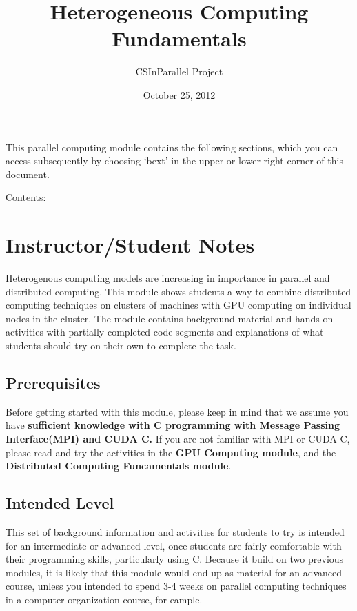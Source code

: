 \documentclass[letterpaper,10pt,openany,oneside]{sphinxmanual}
\title{Heterogeneous Computing Fundamentals}
\date{October 25, 2012}
\author{CSInParallel Project}
\begin{document}
\maketitle
\tableofcontents
{}\label{index::doc}


This parallel computing module contains the following sections, which
you can access subsequently by choosing `bext' in the upper or lower right
corner of this document.

Contents:


\chapter{Instructor/Student Notes}
\label{Prerequisites/Prerequisites:heterogeneous-computing-fundamentals}\label{Prerequisites/Prerequisites:instructor-student-notes}\label{Prerequisites/Prerequisites::doc}
Heterogenous computing models are increasing in importance in parallel and distributed computing.
This module shows students a way to combine distributed computing techniques on clusters of machines with GPU computing on individual nodes in the cluster.  The module contains background material and hands-on activities with partially-completed code segments and explanations of what students should try on their own to complete the task.


\section{Prerequisites}
\label{Prerequisites/Prerequisites:prerequisites}
Before getting started with this module, please keep in mind that we assume you have \textbf{sufficient knowledge with C programming with Message Passing Interface(MPI) and CUDA C.} If you are not familiar with MPI or CUDA C, please read and try the activities in the \textbf{GPU Computing module}, and the \textbf{Distributed Computing Funcamentals module}.


\section{Intended Level}
\label{Prerequisites/Prerequisites:intended-level}
This set of background information and activities for students to try is intended for an intermediate or advanced level, once students are fairly comfortable with their programming skills, particularly using C.  Because it build on two previous modules, it is likely that this module would end up as material for an advanced course, unless you intended to spend 3-4 weeks on parallel computing techniques in a computer organization course, for eample.
\end{document}
